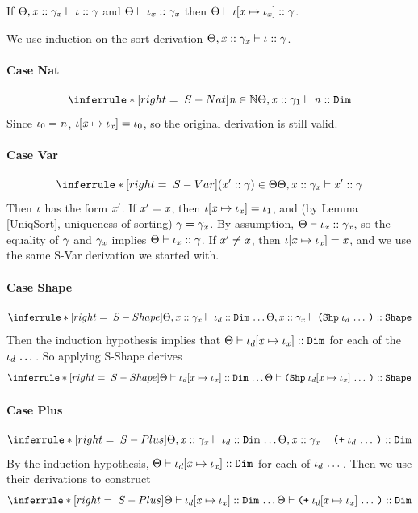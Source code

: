 \newcommand{\idxsubst}[1]{\subst{#1}{\var}{\idx_\var}}
\begin{lemma}
  \label{IISub}
  If $\Theta,\mathit{x} :: \mathit{\gamma}_{\mathit{x}} \vdash \mathit{\iota} :: \mathit{\gamma}$
  and $\Theta \vdash \mathit{\iota}_{\mathit{x}} :: \mathit{\gamma}_{\mathit{x}}$
  then $\sortof{\sEnv}{\idxsubst{\idx}}{\sort}$.
\end{lemma}
\begin{sproof}
  We use induction on the sort derivation
  $\Theta,\mathit{x} :: \mathit{\gamma}_{\mathit{x}} \vdash \mathit{\iota} :: \mathit{\gamma}$.
  \paragraph{Case {\sc Nat}}
  \[\infr[S-Nat]
  {\nat \in \mathbb{N}}
  {\sortof{\sEnv,\hassort{\var}{\sort_1}}{\nat}{\sortdim}}\]
  Since $\mathit{\iota}_0 = \mathit{n}$, $\idxsubst{\idx} = \idx_0$,
  so the original derivation is still valid.
  \paragraph{Case {\sc Var}}
  \[\infr[S-Var]
  {\parens{\hassort{\var'}{\sort}} \in \sEnv}
  {\sortof{\sEnv,\hassort{\var}{\sort_\var}}{\var'}{\sort}}\]
  Then $\mathit{\iota}$ has the form $\mathit{x}'$.
  If $\mathit{x}' = \mathit{x}$, then $\idxsubst{\idx} = \idx_1$,
  and (by Lemma \ref{UniqSort}, uniqueness of sorting) $\mathit{\gamma} = \mathit{\gamma}_{\mathit{x}}$.
  By assumption, $\Theta \vdash \mathit{\iota}_{\mathit{x}} :: \mathit{\gamma}_{\mathit{x}}$,
  so the equality of $\mathit{\gamma}$ and $\mathit{\gamma}_{\mathit{x}}$ implies $\Theta \vdash \mathit{\iota}_{\mathit{x}} :: \mathit{\gamma}$.
  If $\mathit{x}' \not= \mathit{x}$, then $\idxsubst{\idx} = \var$,
  and we use the same {\sc S-Var} derivation we started with.
  \paragraph{Case {\sc Shape}}
  \[\infr[S-Shape]
  {\sequence{\sortof{\sEnv,\hassort{\var}{\sort_\var}}{\idx_d}{\sortdim}}}
  {\sortof{\sEnv,\hassort{\var}{\sort_\var}}{\idxshape{\sequence{\idx_d}}}{\sortshp}}\]
  Then the induction hypothesis implies that
  $\sortof{\sEnv}{\idxsubst{\idx_d}}{\sortdim}$
  for each of the $\mathit{\iota}_d \, \ldots \,$.
  So applying {\sc S-Shape} derives
  \[\infr[S-Shape]
  {\sequence{\sortof{\sEnv}{\idxsubst{\idx_d}}{\sortdim}}}
  {\sortof{\sEnv}{\idxshape{\sequence{\idxsubst{\idx_d}}}}{\sortshp}}\]
  \paragraph{Case {\sc Plus}}
  \[\infr[S-Plus]
  {\sequence{\sortof{\sEnv,\hassort{\var}{\sort_\var}}{\idx_d}{\sortdim}}}
  {\sortof{\sEnv,\hassort{\var}{\sort_\var}}{\idxadd{\sequence{\idx_d}}}{\sortdim}}\]
  By the induction hypothesis,
  $\sortof{\sEnv}{\idxsubst{\idx_d}}{\sortdim}$
  for each of $\mathit{\iota}_d \, \ldots \,$.
  Then we use their derivations to construct
  \[\infr[S-Plus]
  {\sequence{\sortof{\sEnv}{\idxsubst{\idx_d}}{\sortdim}}}
  {\sortof{\sEnv}{\idxadd{\sequence{\idxsubst{\idx_d}}}}{\sortdim}}\]

\end{sproof}
